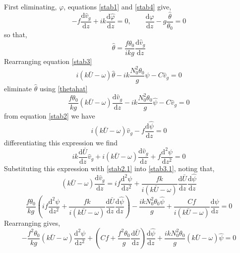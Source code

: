 First eliminating, $\varphi$, equations \ref{stab1} and \ref{stab4} give,
\begin{equation}
	-f\frac{\text{d}\hat{v}_g}{\text{d}z}+ik\frac{\text{d}\hat{\varphi}}{\text{d}z} = 0, \qquad \frac{\text{d}\hat{\varphi}}{\text{d}z} - g\frac{\hat{\theta}}{\theta_0} = 0
\end{equation}
so that,
\begin{equation}
	\hat{\theta} = \frac{f\theta_0}{ikg} \frac{\text{d}\hat{v}_g}{\text{d}z}
\label{thetahat}
\end{equation}
Rearranging equation \ref{stab3}
\begin{equation}
	 i\left( k \bar{U} - \omega \right) \hat{\theta} - ik\frac{N_0^2\theta_0}{g} \hat{\psi} - C\hat{v}_g = 0
\label{stab3.1}
\end{equation}
eliminate $\hat{\theta}$ using \ref{thetahat}
\begin{equation}
	\frac{f\theta_0}{kg}\left( k \bar{U} - \omega \right)  \frac{\text{d}\hat{v}_g}{\text{d}z} - ik\frac{N_0^2\theta_0}{g} \hat{\psi} - C\hat{v}_g = 0
\label{vg}
\end{equation}
from equation \ref{stab2} we have
\begin{equation}
i\left( k \bar{U} - \omega \right) \hat{v}_g - f \frac{\text{d}\hat{\psi}}{\text{d}z} = 0
\label{stab2.1}
\end{equation}
differentiating this expression we find
\begin{equation*}
	ik \frac{\text{d}\bar{U}}{\text{d}z} \hat{v}_g + i(k\bar{U}-\omega)\frac{\text{d}\hat{v}_g}{\text{d}z} + f\frac{\text{d}^2{\psi}}{\text{d}z^2} = 0 
\end{equation*}
Substituting this expression with \ref{stab2.1} into \ref{stab3.1}, noting that,
\begin{equation*}
	(k\bar{U}-\omega)\frac{\text{d}\hat{v}_g}{\text{d}z} = if\frac{\text{d}^2{\psi}}{\text{d}z^2} + \frac{fk}{i(k\bar{U}-\omega)}\frac{\text{d}\bar{U}}{\text{d}z}\frac{\text{d}\hat{\psi}}{\text{d}z}
\end{equation*}
\begin{equation*}
	\frac{f\theta_0}{kg}\left(if\frac{\text{d}^2{\psi}}{\text{d}z^2} + \frac{fk}{i(k\bar{U}-\omega)}\frac{\text{d}\bar{U}}{\text{d}z}\frac{\text{d}\hat{\psi}}{\text{d}z}\right) - \frac{ik N_0^2\theta_0\hat{\psi}}{g} + \frac{Cf}{i(k\bar{U}-\omega)}\frac{\text{d}\psi}{\text{d}z} =0
\end{equation*}
Rearranging gives,
\begin{equation}
	-\frac{f^2\theta_0}{kg}(k\bar{U}-\omega)\frac{\text{d}^2{\psi}}{\text{d}z^2}+\left(Cf+\frac{f^2\theta_0}{g}\frac{\text{d}\bar{U}}{\text{d}z}\right)\frac{\text{d}\hat{\psi}}{\text{d}z}+\frac{ik N_0^2\theta_0}{g}(k\bar{U}-\omega)\hat{\psi}=0
\end{equation}
